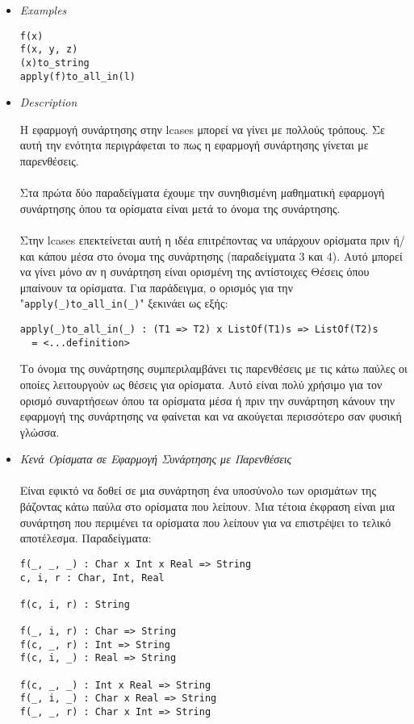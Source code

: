 \documentclass[diploma]{softlab-thesis}
\begin{document}
\begin{itemize}
\item \textit{Examples}

\begin{verbatim}
f(x)
f(x, y, z)
(x)to_string
apply(f)to_all_in(l)
\end{verbatim}

\item \textit{Description}

Η εφαρμογή συνάρτησης στην lcases μπορεί να γίνει με πολλούς τρόπους.  Σε αυτή
την ενότητα περιγράφεται το πως η εφαρμογή συνάρτησης γίνεται με παρενθέσεις.
\\\\
Στα πρώτα δύο παραδείγματα έχουμε την συνηθισμένη μαθηματική εφαρμογή
συνάρτησης όπου τα ορίσματα είναι μετά το όνομα της συνάρτησης.
\\\\
Στην lcases επεκτείνεται αυτή η ιδέα επιτρέποντας να υπάρχουν ορίσματα πριν
ή/και κάπου μέσα στο όνομα της συνάρτησης (παραδείγματα 3 και 4). Αυτό μπορεί
να γίνει μόνο αν η συνάρτηση είναι ορισμένη της αντίστοιχες Θέσεις όπου
μπαίνουν τα ορίσματα. Για παράδειγμα, ο ορισμός για την
"\verb|apply(_)to_all_in(_)|" ξεκινάει ως εξής:
\begin{verbatim}
apply(_)to_all_in(_) : (T1 => T2) x ListOf(T1)s => ListOf(T2)s
  = <...definition>
\end{verbatim}
Το όνομα της συνάρτησης συμπεριλαμβάνει τις παρενθέσεις με τις κάτω παύλες οι
οποίες λειτουργούν ως θέσεις για ορίσματα.  Αυτό είναι πολύ χρήσιμο για τον
ορισμό συναρτήσεων όπου τα ορίσματα μέσα ή πριν την συνάρτηση κάνουν την
εφαρμογή της συνάρτησης να φαίνεται και να ακούγεται περισσότερο σαν φυσική
γλώσσα.

\item \textit{Κενά Ορίσματα σε Εφαρμογή Συνάρτησης με Παρενθέσεις}
\\\\
Είναι εφικτό να δοθεί σε μια συνάρτηση ένα υποσύνολο των ορισμάτων της
βάζοντας κάτω παύλα στο ορίσματα που λείπουν. Μια τέτοια έκφραση είναι μια
συνάρτηση που περιμένει τα ορίσματα που λείπουν για να επιστρέψει το τελικό
αποτέλεσμα. Παραδείγματα:
\begin{verbatim}
f(_, _, _) : Char x Int x Real => String
c, i, r : Char, Int, Real

f(c, i, r) : String

f(_, i, r) : Char => String
f(c, _, r) : Int => String
f(c, i, _) : Real => String

f(c, _, _) : Int x Real => String
f(_, i, _) : Char x Real => String
f(_, _, r) : Char x Int => String
\end{verbatim}

\end{itemize}
\end{document}
